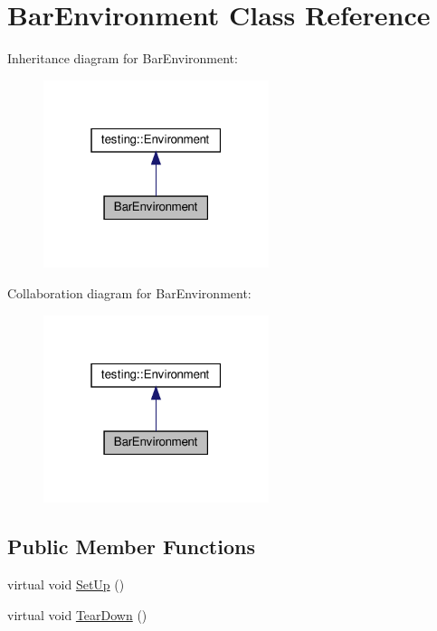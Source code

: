 \hypertarget{class_bar_environment}{}\section{Bar\+Environment Class Reference}
\label{class_bar_environment}


Inheritance diagram for Bar\+Environment\+:
\nopagebreak
\begin{figure}[H]
\begin{center}
\leavevmode
\includegraphics[width=187pt]{class_bar_environment__inherit__graph}
\end{center}
\end{figure}


Collaboration diagram for Bar\+Environment\+:
\nopagebreak
\begin{figure}[H]
\begin{center}
\leavevmode
\includegraphics[width=187pt]{class_bar_environment__coll__graph}
\end{center}
\end{figure}
\subsection*{Public Member Functions}
\begin{DoxyCompactItemize}
\item 
virtual void \hyperlink{class_bar_environment_a88e17c5dd1dcea7a4538f2f3c6bf7bdd}{Set\+Up} ()
\item 
virtual void \hyperlink{class_bar_environment_a384f951da72a2a18bb0c2b3506376b09}{Tear\+Down} ()
\end{DoxyCompactItemize}


